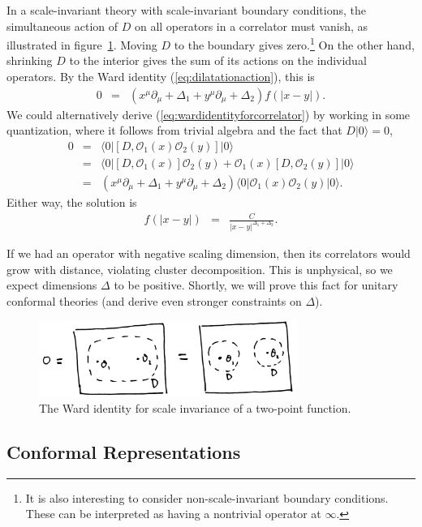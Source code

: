 \documentclass[11pt]{ws-rv9x6}
\newcommand\be{\begin{eqnarray}}
\newcommand\ee{\end{eqnarray}}
\newcommand\cO{\mathcal{O}}
\newcommand\p[1]{\left(#1\right)}
\newcommand\ptl\partial
\newcommand\<\langle
\renewcommand\>\rangle
\newcommand\nn{\nonumber}
\renewcommand\.{\cdot}
\newcommand\De{\Delta}
\newcommand\oo\infty
\begin{document}
In a scale-invariant theory with scale-invariant boundary conditions, the simultaneous action of $D$ on all operators in a correlator must vanish, as illustrated in figure~\ref{fig:wardidentityford}.  Moving $D$ to the boundary gives zero.\footnote{It is also interesting to consider non-scale-invariant boundary conditions. These can be interpreted as having a nontrivial operator at $\oo$.}  On the other hand, shrinking $D$ to the interior gives the sum of its actions on the individual operators.  By the Ward identity (\ref{eq:dilatationaction}), this is
\be
\label{eq:wardidentityforcorrelator}
0 &=& \p{x^\mu\ptl_\mu + \Delta_1+y^\mu\ptl_\mu+\Delta_2}f(|x-y|).
\ee
We could alternatively derive (\ref{eq:wardidentityforcorrelator}) by working in some quantization, where it follows from trivial algebra and the fact that $D|0\> = 0$,
\be
0 &=& \<0|[D,\cO_1(x)\cO_2(y)]|0\>\nn\\
&=& \<0|[D,\cO_1(x)]\cO_2(y)+\cO_1(x)[D,\cO_2(y)]|0\>\nn\\
&=& \p{x^\mu\ptl_\mu + \Delta_1+y^\mu\ptl_\mu+\Delta_2}\<0|\cO_1(x)\cO_2(y)|0\>.
\ee
Either way, the solution is
\be
f(|x-y|) &=& \frac{C}{|x-y|^{\Delta_1+\Delta_2}}.
\ee


If we had an operator with negative scaling dimension, then its correlators would grow with distance, violating cluster decomposition. This is unphysical, so we expect dimensions $\De$ to be positive. Shortly, we will prove this fact for unitary conformal theories (and derive even stronger constraints on $\De$).

\begin{figure}
\begin{center}
\includegraphics[width=0.75\textwidth]{wardidentityford.jpg}
\end{center}
\caption{The Ward identity for scale invariance of a two-point function. \label{fig:wardidentityford}}
\end{figure}


\subsection{Conformal Representations}
\end{document}
